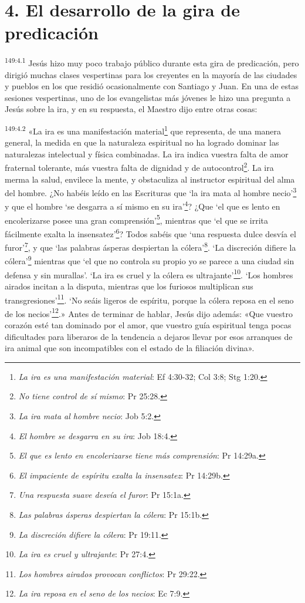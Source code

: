 \section*{4. El desarrollo de la gira de predicación}
\par 
\textsuperscript{149:4.1} Jesús hizo muy poco trabajo público durante esta gira de predicación, pero dirigió muchas clases vespertinas para los creyentes en la mayoría de las ciudades y pueblos en los que residió ocasionalmente con Santiago y Juan. En una de estas sesiones vespertinas, uno de los evangelistas más jóvenes le hizo una pregunta a Jesús sobre la ira, y en su respuesta, el Maestro dijo entre otras cosas:

\par 
\textsuperscript{149:4.2} «La ira es una manifestación material\footnote{\textit{La ira es una manifestación material}: Ef 4:30-32; Col 3:8; Stg 1:20.} que representa, de una manera general, la medida en que la naturaleza espiritual no ha logrado dominar las naturalezas intelectual y física combinadas. La ira indica vuestra falta de amor fraternal tolerante, más vuestra falta de dignidad y de autocontrol\footnote{\textit{No tiene control de sí mismo}: Pr 25:28.}. La ira merma la salud, envilece la mente, y obstaculiza al instructor espiritual del alma del hombre. ¿No habéis leído en las Escrituras que `la ira mata al hombre necio'\footnote{\textit{La ira mata al hombre necio}: Job 5:2.} y que el hombre `se desgarra a sí mismo en su ira'\footnote{\textit{El hombre se desgarra en su ira}: Job 18:4.}? ¿Que `el que es lento en encolerizarse posee una gran comprensión'\footnote{\textit{El que es lento en encolerizarse tiene más comprensión}: Pr 14:29a.}, mientras que `el que se irrita fácilmente exalta la insensatez'\footnote{\textit{El impaciente de espíritu exalta la insensatez}: Pr 14:29b.}? Todos sabéis que `una respuesta dulce desvía el furor'\footnote{\textit{Una respuesta suave desvía el furor}: Pr 15:1a.}, y que `las palabras ásperas despiertan la cólera'\footnote{\textit{Las palabras ásperas despiertan la cólera}: Pr 15:1b.}. `La discreción difiere la cólera'\footnote{\textit{La discreción difiere la cólera}: Pr 19:11.} mientras que `el que no controla su propio yo se parece a una ciudad sin defensa y sin murallas'. `La ira es cruel y la cólera es ultrajante'\footnote{\textit{La ira es cruel y ultrajante}: Pr 27:4.}. `Los hombres airados incitan a la disputa, mientras que los furiosos multiplican sus transgresiones'\footnote{\textit{Los hombres airados provocan conflictos}: Pr 29:22.}. `No seáis ligeros de espíritu, porque la cólera reposa en el seno de los necios'\footnote{\textit{La ira reposa en el seno de los necios}: Ec 7:9.}.» Antes de terminar de hablar, Jesús dijo además: «Que vuestro corazón esté tan dominado por el amor, que vuestro guía espiritual tenga pocas dificultades para liberaros de la tendencia a dejaros llevar por esos arranques de ira animal que son incompatibles con el estado de la filiación divina».

